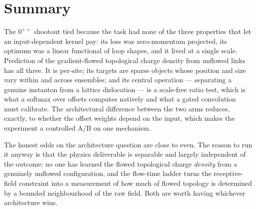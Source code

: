 \documentclass[11pt,a4paper]{article}
\begin{document}
\section{Summary}

The $0^{++}$ shootout tied because the task had none of the three properties that
let an input-dependent kernel pay: its loss was zero-momentum projected, its
optimum was a linear functional of loop shapes, and it lived at a single scale.
Prediction of the gradient-flowed topological charge density from unflowed links
has all three. It is per-site; its targets are sparse objects whose position and
size vary within and across ensembles; and its central operation --- separating a
genuine instanton from a lattice dislocation --- is a scale-free ratio test,
which is what a softmax over offsets computes natively and what a gated
convolution must calibrate. The architectural difference between the two arms
reduces, exactly, to whether the offset weights depend on the input, which makes
the experiment a controlled A/B on one mechanism.

The honest odds on the architecture question are close to even. The reason to run
it anyway is that the physics deliverable is separable and largely independent of
the outcome: no one has learned the flowed topological charge \emph{density}
from a genuinely unflowed configuration, and the flow-time ladder turns the
receptive-field constraint into a measurement of how much of flowed topology is
determined by a bounded neighbourhood of the raw field. Both are worth having
whichever architecture wins.
\end{document}

